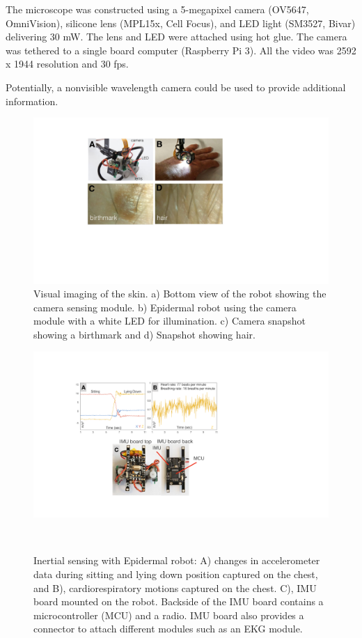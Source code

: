 The microscope was constructed using a 5-megapixel camera (OV5647, OmniVision), silicone lens (MPL15x, Cell Focus), and LED light (SM3527, Bivar) delivering 30 mW. The lens and LED were attached using hot glue. The camera was tethered to a single board computer (Raspberry Pi 3). All the video was 2592 x 1944 resolution and 30 fps. 

Potentially, a nonvisible wavelength camera could be used to provide additional information. 

\begin{figure}[!t]
\centering
\includegraphics[width=0.9\columnwidth]{pictures/applications/visual_inspection.pdf}
\caption{Visual imaging of the skin. a) Bottom view of the robot showing the camera
sensing module. b) Epidermal robot using the camera module with a white LED for illumination. c) Camera snapshot showing a birthmark and d) Snapshot showing hair. }
\label{fig:visual_sensing}
\end{figure}

\begin{figure}[!t]
\centering
\includegraphics[width=0.9\columnwidth]{pictures/applications/IMU_sensing.pdf}
\caption{Inertial sensing with Epidermal robot: A) changes in accelerometer data during sitting and lying down position captured on the chest, and B), cardiorespiratory
motions captured on the chest. C), IMU board mounted on the robot. Backside of the IMU board contains a microcontroller (MCU) and a radio. IMU board also provides a connector to attach different modules such as an EKG module. }~\label{fig:imu_sensing}
\end{figure}

